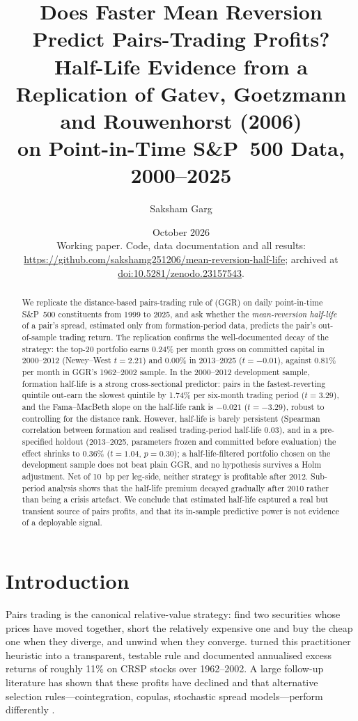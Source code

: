 \documentclass[11pt]{article}
\title{Does Faster Mean Reversion Predict Pairs-Trading Profits?\\[4pt]
\large Half-Life Evidence from a Replication of Gatev, Goetzmann and Rouwenhorst (2006)\\on Point-in-Time S\&P~500 Data, 2000--2025}
\author{Saksham Garg}
\date{October 2026 \\ \small Working paper. Code, data documentation and all results: \url{https://github.com/sakshamg251206/mean-reversion-half-life}; archived at \href{https://doi.org/10.5281/zenodo.23157543}{doi:10.5281/zenodo.23157543}.}
\begin{document}
\maketitle

\begin{abstract}
\noindent
We replicate the distance-based pairs-trading rule of \citet{gatev2006} (GGR) on daily point-in-time S\&P~500 constituents from 1999 to 2025, and ask whether the \emph{mean-reversion half-life} of a pair's spread, estimated only from formation-period data, predicts the pair's out-of-sample trading return. The replication confirms the well-documented decay of the strategy: the top-20 portfolio earns 0.24\% per month gross on committed capital in 2000--2012 (Newey--West $t=2.21$) and 0.00\% in 2013--2025 ($t=-0.01$), against 0.81\% per month in GGR's 1962--2002 sample. In the 2000--2012 development sample, formation half-life is a strong cross-sectional predictor: pairs in the fastest-reverting quintile out-earn the slowest quintile by 1.74\% per six-month trading period ($t=3.29$), and the Fama--MacBeth slope on the half-life rank is $-0.021$ ($t=-3.29$), robust to controlling for the distance rank. However, half-life is barely persistent (Spearman correlation between formation and realised trading-period half-life 0.03), and in a pre-specified holdout (2013--2025, parameters frozen and committed before evaluation) the effect shrinks to 0.36\% ($t=1.04$, $p=0.30$); a half-life-filtered portfolio chosen on the development sample does not beat plain GGR, and no hypothesis survives a Holm adjustment. Net of 10~bp per leg-side, neither strategy is profitable after 2012. Sub-period analysis shows that the half-life premium decayed gradually after 2010 rather than being a crisis artefact. We conclude that estimated half-life captured a real but transient source of pairs profits, and that its in-sample predictive power is not evidence of a deployable signal.
\end{abstract}

\section{Introduction}

Pairs trading is the canonical relative-value strategy: find two securities whose prices have moved together, short the relatively expensive one and buy the cheap one when they diverge, and unwind when they converge. \citet{gatev2006} turned this practitioner heuristic into a transparent, testable rule and documented annualised excess returns of roughly 11\% on CRSP stocks over 1962--2002. A large follow-up literature has shown that these profits have declined \citep{dofaff2010,dofaff2012} and that alternative selection rules---cointegration, copulas, stochastic spread models---perform differently \citep{elliott2005,avellaneda2010,rad2016,krauss2017}.
\end{document}
